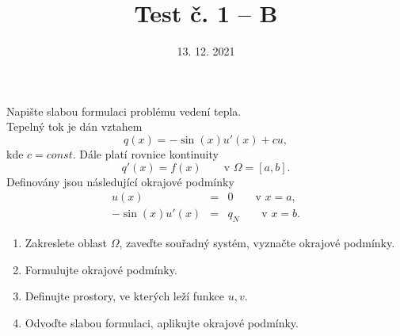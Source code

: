 \documentclass{article}
\begin{document}
\title{Test č. 1 -- B}
\date{13. 12. 2021}
\author{}
\maketitle


\noindent

Napište slabou formulaci problému vedení tepla.\\
Tepelný tok je dán vztahem
\[
q(x) = -\sin(x) u'(x) + cu,
\]
kde $c=const$. Dále platí rovnice kontinuity
\[
q'(x) = f(x) \qquad \textrm{v }\Omega=[a,b].
\]
Definovány jsou následující okrajové podmínky
\begin{eqnarray*}
u(x) &=& 0 \qquad \textrm{v } x=a, \\
-\sin(x) u'(x) &=& q_N \qquad \textrm{v } x=b.
\end{eqnarray*}

\begin{enumerate}
\item Zakreslete oblast $\Omega$, zaveďte souřadný systém, vyznačte okrajové podmínky.
\item Formulujte okrajové podmínky.
\item Definujte prostory, ve kterých leží funkce $u,v$.
\item Odvoďte slabou formulaci, aplikujte okrajové podmínky.
\end{enumerate}
\end{document}
